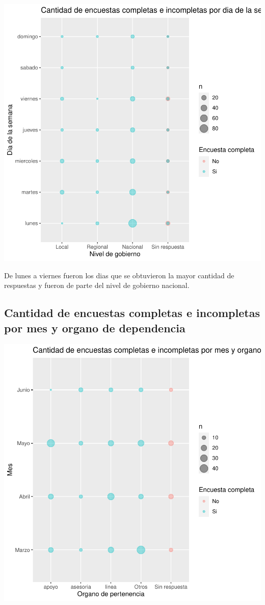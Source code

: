 \documentclass{article}
\begin{document}
\includegraphics{seguimientov3-086}

De lunes a viernes fueron los dias que se obtuvieron la mayor cantidad de respuestas y fueron de parte del nivel de gobierno nacional.

\subsection{Cantidad de encuestas completas e incompletas por mes y organo de dependencia}

\includegraphics{seguimientov3-087}
\end{document}
